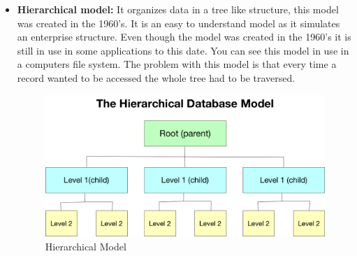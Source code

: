 \begin{itemize}
	\item {\textbf{Hierarchical model:} It organizes data in a tree like structure, this model was created in the 1960’s. It is an easy to understand model as it simulates an enterprise structure. Even though the model was created in the 1960’s it is still in use in some applications to this date. You can see this model in use in a computers file system. The problem with this model is that every time a record wanted to be accessed the whole tree had to be traversed.
	\clearpage
	\begin{center}
		\begin{figure}[h!]
			\centering
			\includegraphics[scale=0.32]{./images/3-hierarchical-model}
			\caption{Hierarchical Model}
			\label{hier_model}
		\end{figure}
	\end{center}
	}
	

\end{itemize}
